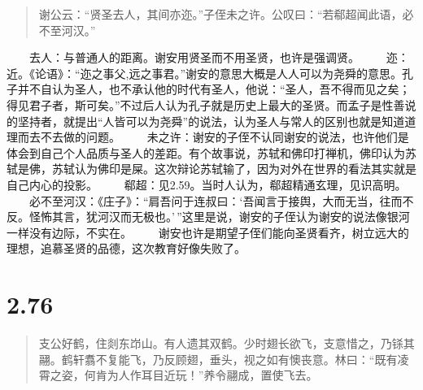 \documentclass[]{book}
\begin{document}
\begin{quote}
谢公云：``贤圣去人，其间亦迩。''子侄未之许。公叹曰：``若郗超闻此语，必不至河汉。''
\end{quote}

　　去人：与普通人的距离。谢安用贤圣而不用圣贤，也许是强调贤。
　　迩：近。《论语》：``迩之事父,远之事君。''谢安的意思大概是人人可以为尧舜的意思。孔子并不自认为圣人，也不承认他的时代有圣人，他说：``圣人，吾不得而见之矣；得见君子者，斯可矣。''不过后人认为孔子就是历史上最大的圣贤。而孟子是性善说的坚持者，就提出``人皆可以为尧舜''的说法，认为圣人与常人的区别也就是知道道理而去不去做的问题。
　　未之许：谢安的子侄不认同谢安的说法，也许他们是体会到自己个人品质与圣人的差距。有个故事说，苏轼和佛印打禅机，佛印认为苏轼是佛，苏轼认为佛印是屎。这次辩论苏轼输了，因为对外在世界的看法其实就是自己内心的投影。
　　郗超：见2.59。当时人认为，郗超精通玄理，见识高明。
　　必不至河汉：《庄子》：``肩吾问于连叔曰：`吾闻言于接舆，大而无当，往而不反。怪怖其言，犹河汉而无极也。'\,''这里是说，谢安的子侄认为谢安的说法像银河一样没有边际，不实在。
　　谢安也许是期望子侄们能向圣贤看齐，树立远大的理想，追慕圣贤的品德，这次教育好像失败了。

\section{2.76}\label{section-122}

\begin{quote}
支公好鹤，住剡东岇山。有人遗其双鹤。少时翅长欲飞，支意惜之，乃铩其翮。鹤轩翥不复能飞，乃反顾翅，垂头，视之如有懊丧意。林曰：``既有凌霄之姿，何肯为人作耳目近玩！''养令翮成，置使飞去。
\end{quote}
\end{document}
